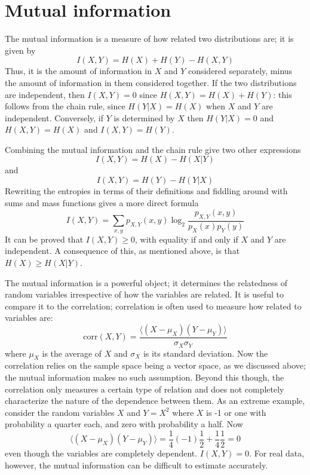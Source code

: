 \documentclass[12pt]{article}
\begin{document}
\section*{Mutual information}

The mutual information is a measure of how related two distributions are; it is given by
\begin{equation}
I(X,Y)=H(X)+H(Y)-H(X,Y)
\end{equation}
Thus, it is the amount of information in $X$ and $Y$ considered
separately, minus the amount of information in them considered
together. If the two distributions are independent, then $I(X,Y)=0$
since $H(X,Y)=H(X)+H(Y)$: this follows from the chain rule, since
$H(Y|X)=H(X)$ when $X$ and $Y$ are independent. Conversely, if $Y$ is
determined by $X$ then $H(Y|X)=0$ and $H(X,Y)=H(X)$ and $I(X,Y)=H(Y)$.

Combining the mutual information and the chain rule give two other expressions
\begin{equation}
I(X,Y)=H(X)-H(X|Y)
\end{equation}
and 
\begin{equation}
I(X,Y)=H(Y)-H(Y|X)
\end{equation}
Rewriting the entropies in terms of their definitions and fiddling
around with sums and mass functions gives a more direct formula
\begin{equation}
I(X,Y)=\sum_{x,y}p_{X,Y}(x,y)\log_2\frac{p_{X,Y}(x,y)}{p_X(x)p_Y(y)}
\end{equation}
It can be proved that $I(X,Y)\ge 0$, with equality if and only if $X$
and $Y$ are independent. A consequence of this, as mentioned above, is
that $H(X)\ge H(X|Y)$.

The mutual information is a powerful object; it determines the
relatedness of random variables irrespective of how the variables are
related. It is useful to compare it to the correlation; correlation is
often used to measure how related to variables are:
\begin{equation}
\mbox{corr}(X,Y)=\frac{\langle (X-\mu_X)(Y-\mu_Y)\rangle}{\sigma_X\sigma_Y}
\end{equation}
where $\mu_X$ is the average of $X$ and $\sigma_X$ is its standard
deviation. Now the correlation relies on the sample space being a
vector space, as we discussed above; the mutual information makes no
such assumption. Beyond this though, the correlation only measures a
certain type of relation and does not completely characterize the
nature of the dependence between them. As an extreme example, consider
the random variables $X$ and $Y=X^2$ where $X$ is -1 or one with
probability a quarter each, and zero with probability a half. Now 
\begin{equation}
\langle (X-\mu_X)(Y-\mu_Y)\rangle=\frac{1}{4}(-1)\frac{1}{2}+\frac{1}{4}\frac{1}{2}=0
\end{equation}
even though the variables are completely dependent. $I(X,Y)=0$. For
real data, however, the mutual information can be difficult to
estimate accurately.
\end{document}
